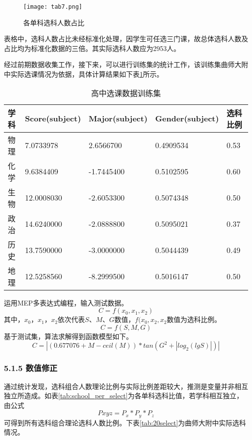 \documentclass[bwprint]{cumcmthesis}
\begin{document}
\begin{figure}[!ht]
	\centering
	\texttt{[image: tab7.png]}
	\caption{各单科选科人数占比}
\end{figure}

表格中，选科人数占比未经标准化处理，因学生可任选三门课，故总体选科人数及占比均为标准化数据的三倍。其实际选科人数应为2953人。

经过前期数据收集工作，接下来，可以进行训练集的统计工作，该训练集曲师大附中实际选课情况为依据，具体计算结果如下表\ref{tab:final_result}所示。

	\begin{longtable}{p{2cm}p{3cm}p{3cm}p{3cm}p{3cm}}
		\caption{\label{tab:final_result}高中选课数据训练集}\\
		\toprule
		学科    & \multicolumn{1}{l}{Score(subject)} & \multicolumn{1}{l}{Major(subject)} & \multicolumn{1}{l}{Gender(subject)} & \multicolumn{1}{l}{选科比例} \\
		\midrule
		物理    & 7.0733978  & 2.6566700  & 0.4909534  & 0.53  \\
		化学    & 9.6384409  & -1.7445400  & 0.5102595  & 0.60  \\
		生物    & 12.0008030  & -2.6053300  & 0.5074348  & 0.50  \\
		政治    & 14.6240000  & -2.0888800  & 0.5095021  & 0.37  \\
		历史    & 13.7590000  & -3.0000000  & 0.5044439  & 0.49  \\
		地理    & 12.5258560  & -8.2999500  & 0.5016147  & 0.50  \\
		\bottomrule
		
	\end{longtable}%

运用MEP多表达式编程\cite{alavi2010multi}\cite{zhang2012predicting}，输入测试数据。
\begin{equation}
C = f(x_0,x_1,x_2)
\end{equation}
其中，$ x_0 $，$ x_1 $，$ x_2 $依次代表$ S $、$ M $、$ G $数值，$ f(x_0,x_2,x_2 $数值为选科比例。
\begin{equation}
C = f(S,M,G)
\end{equation}
基于测试集，算法求解得到函数模型如下。
\begin{equation}
C = |(0.677076+M-ceil(M))*tan(G^2+|log_2(lgS)|)|
\end{equation}
\subsubsection{5.1.5 数值修正}
通过统计发现，选科组合人数理论比例与实际比例差距较大，推测是变量并非相互独立所造成。如表\ref{tab:school_per_select}为各单科选科比值，若学科相互独立，由公式
\begin{equation}
P{xyz} = P_x*P_y*P_z
\end{equation}
可得到所有选科组合理论选科人数比例。下表\ref{tab:20select}为曲师大附中实际选科情况。
\end{document}
